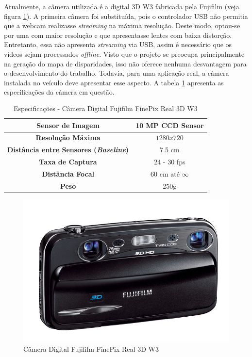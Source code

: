 Atualmente, a câmera utilizada é a digital 3D W3 fabricada pela Fujifilm (veja figura \ref{fujiW3}). A primeira câmera foi substituída, pois o controlador USB não permitia que a webcam realizasse \textit{streaming} na máxima resolução. Deste modo, optou-se por uma com maior resolução e que apresentasse lentes com baixa distorção. Entretanto, essa não apresenta \textit{streaming} via USB, assim é necessário que os vídeos sejam processados \textit{offline}. Visto que o projeto se preocupa principalmente na geração do mapa de disparidades, isso não oferece nenhuma desvantagem para o desenvolvimento do trabalho. Todavia, para uma aplicação real, a câmera instalada no veículo deve apresentar esse aspecto. A tabela \ref{fujiW3_tab} apresenta as especificações da câmera em questão.

\begin{table}[]
\centering
\caption{Especificações - Câmera Digital Fujifilm FinePix Real 3D W3}
\label{fujiW3_tab}
\begin{tabular}{|c|c|}
\hline
\textbf{Sensor de Imagem}      & 10 MP CCD Sensor  		\\	\hline
\textbf{Resolução Máxima}      & $1280x720$        		\\	\hline
\textbf{Distância entre Sensores (\textit{Baseline})} & 7.5 cm  \\	\hline
\textbf{Taxa de Captura}      & 24 - 30 fps          		\\	\hline
\textbf{Distância Focal}       & 60 cm até $\infty$		\\	\hline
\textbf{Peso}       		      & 250g			\\	\hline
\end{tabular}
\end{table}

\begin{figure}[H]
	\centering
	\includegraphics[scale=0.35]{./Resources/fujiW3.jpg}
	\caption{Câmera Digital Fujifilm FinePix Real 3D W3}
	\label{fujiW3}
\end{figure}


